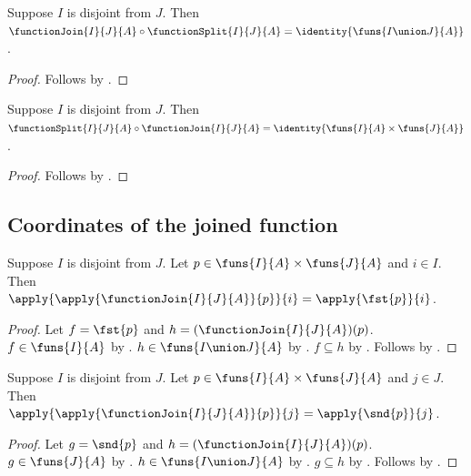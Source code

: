 \begin{corollary}\label{function_join_split}
    Suppose $I$ is disjoint from $J$.
    Then $\functionJoin{I}{J}{A}\circ\functionSplit{I}{J}{A}
        =\identity{\funs{I\union J}{A}}$.
\end{corollary}
\begin{proof}
    Follows by .
\end{proof}

\begin{corollary}\label{function_split_join}
    Suppose $I$ is disjoint from $J$.
    Then $\functionSplit{I}{J}{A}\circ\functionJoin{I}{J}{A}
        =\identity{\funs{I}{A}\times\funs{J}{A}}$.
\end{corollary}
\begin{proof}
    Follows by .
\end{proof}

\subsection{Coordinates of the joined function}

\begin{proposition}\label{function_join_left_apply}
    Suppose $I$ is disjoint from $J$.
    Let $p\in\funs{I}{A}\times\funs{J}{A}$ and $i\in I$.
    Then $\apply{\apply{\functionJoin{I}{J}{A}}{p}}{i}=\apply{\fst{p}}{i}$.
\end{proposition}
\begin{proof}
    Let $f=\fst{p}$ and $h=(\functionJoin{I}{J}{A})(p)$.
    $f\in\funs{I}{A}$ by .
    $h\in\funs{I\union J}{A}$ by .
    $f\subseteq h$ by .
    Follows by .
\end{proof}

\begin{proposition}\label{function_join_right_apply}
    Suppose $I$ is disjoint from $J$.
    Let $p\in\funs{I}{A}\times\funs{J}{A}$ and $j\in J$.
    Then $\apply{\apply{\functionJoin{I}{J}{A}}{p}}{j}=\apply{\snd{p}}{j}$.
\end{proposition}
\begin{proof}
    Let $g=\snd{p}$ and $h=(\functionJoin{I}{J}{A})(p)$.
    $g\in\funs{J}{A}$ by .
    $h\in\funs{I\union J}{A}$ by .
    $g\subseteq h$ by .
    Follows by .
\end{proof}

